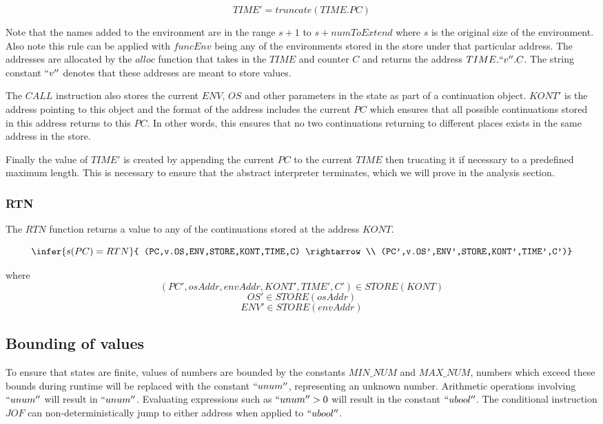 \documentclass[12pt]{article}
\begin{document}
$$TIME' = truncate(TIME.PC)$$

Note that the names added to the environment are in the range $s+1$ to $s+numToExtend$ where $s$ is the original size of the environment. Also note this rule can be applied with $funcEnv$ being any of the environments stored in the store under that particular address. The addresses are allocated by the $alloc$ function that takes in the $TIME$ and counter $C$ and returns the address $TIME.``v''.C$. The string constant $``v''$ denotes that these addreses are meant to store values.

The $CALL$ instruction also stores the current $ENV$, $OS$ and other parameters in the state as part of a continuation object. $KONT'$ is the address pointing to this object and the format of the address includes the current $PC$ which ensures that all possible continuations stored in this address returns to this $PC$. In other words, this ensures that no two continuations returning to different places exists in the same address in the store.

Finally the value of $TIME'$ is created by appending the current $PC$ to the current $TIME$ then trucating it if necessary to a predefined maximum length. This is necessary to ensure that the abstract interpreter terminates, which we will prove in the analysis section.

\subsubsection{RTN}
The $RTN$ function returns a value to any of the continuations stored at the address $KONT$.

$$\infer{s(PC) = RTN}{
    (PC,v.OS,ENV,STORE,KONT,TIME,C) \rightarrow \\
    (PC',v.OS',ENV',STORE,KONT',TIME',C')}$$

where
$$(PC',osAddr,envAddr,KONT',TIME',C') \in STORE(KONT)$$
$$OS' \in STORE(osAddr)$$
$$ENV' \in STORE(envAddr)$$

\subsection{Bounding of values}
To ensure that states are finite, values of numbers are bounded by the constants $MIN\_NUM$ and $MAX\_NUM$, numbers which exceed these bounds during runtime will be replaced with the constant $``unum''$, representing an unknown number. Arithmetic operations involving $``unum''$ will result in $``unum''$. Evaluating expressions such as $``unum'' > 0$ will result in the constant $``ubool''$. The conditional instruction $JOF$ can non-deterministically jump to either address when applied to $``ubool''$.
\end{document}
